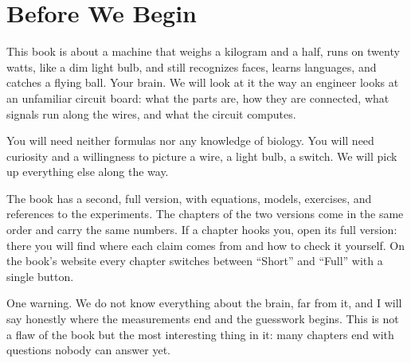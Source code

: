 \chapter*{Before We Begin}

This book is about a machine that weighs a kilogram and a half, runs on twenty watts, like a dim light bulb, and still recognizes faces, learns languages, and catches a flying ball. Your brain. We will look at it the way an engineer looks at an unfamiliar circuit board: what the parts are, how they are connected, what signals run along the wires, and what the circuit computes.

You will need neither formulas nor any knowledge of biology. You will need curiosity and a willingness to picture a wire, a light bulb, a switch. We will pick up everything else along the way.

The book has a second, full version, with equations, models, exercises, and references to the experiments. The chapters of the two versions come in the same order and carry the same numbers. If a chapter hooks you, open its full version: there you will find where each claim comes from and how to check it yourself. On the book's website every chapter switches between ``Short'' and ``Full'' with a single button.

One warning. We do not know everything about the brain, far from it, and I will say honestly where the measurements end and the guesswork begins. This is not a flaw of the book but the most interesting thing in it: many chapters end with questions nobody can answer yet.
